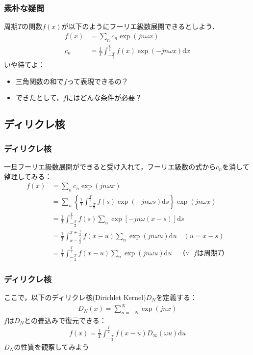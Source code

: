 \documentclass[dvipdfmx,graphicx,14pt]{beamer}
\begin{document}
\begin{frame}[c]
    \frametitle{素朴な疑問}
    周期$T$の関数$f(x)$が以下のようにフーリエ級数展開できるとしよう．
    \begin{align*}
        f(x) &= \sum_{n} c_{n} \exp(jn\omega x) \\
        c_{n} &= \frac{1}{T} \int_{-\frac{T}{2}}^{\frac{T}{2}} f(x) \exp(-jn\omega x) \mathrm{d} x
    \end{align*}
    いや待てよ：
    \begin{itemize}
        \item 三角関数の和で$f$って表現できるの？
        \item できたとして，$f$にはどんな条件が必要？
    \end{itemize}
\end{frame}

\subsection{ディリクレ核}

\begin{frame}[c]
    \frametitle{ディリクレ核}
    一旦フーリエ級数展開ができると受け入れて，フーリエ級数の式から$c_{n}$を消して整理してみる：
    \footnotesize
    \begin{align*}
        f(x) &= \sum_{n} c_{n} \exp(jn\omega x) \\
         &= \sum_{n} \left\{ \frac{1}{T} \int_{-\frac{T}{2}}^{\frac{T}{2}} f(s) \exp(-jn\omega s) \mathrm{d} s \right\} \exp(jn\omega x) \\
         &= \frac{1}{T} \int_{-\frac{T}{2}}^{\frac{T}{2}} f(s) \sum_{n} \exp[-jn\omega(x-s)] \mathrm{d} s \\
         &= \frac{1}{T} \int_{x-\frac{T}{2}}^{x+\frac{T}{2}} f(x-u) \sum_{n} \exp(jn\omega u) \mathrm{d} u  \quad (u = x - s) \\
         &= \frac{1}{T} \int_{-\frac{T}{2}}^{\frac{T}{2}} f(x-u) \sum_{n} \exp(jn\omega u) \mathrm{d} u \quad \text{（$\because$ $f$は周期$T$）}
    \end{align*}
\end{frame}

\begin{frame}[c]
    \frametitle{ディリクレ核}
    ここで，以下のディリクレ核(Dirichlet Kernel)$D_{N}$を定義する：
    \begin{align}
        D_{N}(x) = \sum_{n=-N}^{N} \exp(jnx)
    \end{align}
    $f$は$D_{N}$との畳込みで復元できる：
    \begin{align*}
        f(x) = \frac{1}{T} \int_{-\frac{T}{2}}^{\frac{T}{2}} f(x-u) D_{\infty}(\omega u) \mathrm{d} u
    \end{align*}
    $D_{N}$の性質を観察してみよう
\end{frame}
\end{document}
